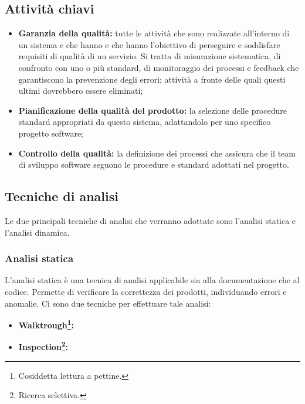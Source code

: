 \subsection{Attività chiavi}
\begin{itemize}
	\item \textbf{Garanzia della qualità:} tutte le attività che sono realizzate all'interno di un sistema e che hanno e che hanno l'obiettivo di perseguire e soddisfare requisiti di qualità di un servizio. Si tratta di misurazione sistematica, di confronto con uno o più standard, di monitoraggio dei processi e feedback che garantiscono la prevenzione degli errori; attività a fronte delle quali questi ultimi dovrebbero essere eliminati;
	\item \textbf{Pianificazione della qualità del prodotto:} la selezione delle procedure standard appropriati da questo sistema, adattandolo per uno specifico progetto software;
	\item \textbf{Controllo della qualità:} la definizione dei processi che assicura che il team  di sviluppo software seguono le procedure e standard adottati nel progetto.
\end{itemize}
\newpage
\subsection{Tecniche di analisi}
Le due principali tecniche di analisi che verranno adottate sono l'analisi statica e l'analisi dinamica.
	\subsubsection{Analisi statica}
	L'analisi statica è una tecnica di analisi applicabile sia alla documentazione che al codice. Permette di verificare la correttezza dei prodotti, individuando errori e anomalie. Ci sono due tecniche per effettuare tale analisi:
	\begin{itemize}
		\item \textbf{Walktrough\footnote{Cosiddetta lettura a pettine.}:} 
		\item \textbf{Inspection\footnote{Ricerca selettiva.}:} 
	\end{itemize}
	
